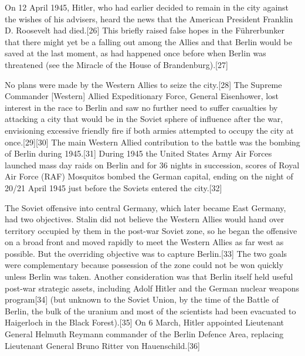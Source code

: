 On 12 April 1945, Hitler, who had earlier decided to remain in the city against the wishes of his advisers, heard the news that the American President Franklin D. Roosevelt had died.[26] This briefly raised false hopes in the Führerbunker that there might yet be a falling out among the Allies and that Berlin would be saved at the last moment, as had happened once before when Berlin was threatened (see the Miracle of the House of Brandenburg).[27]

No plans were made by the Western Allies to seize the city.[28] The Supreme Commander [Western] Allied Expeditionary Force, General Eisenhower, lost interest in the race to Berlin and saw no further need to suffer casualties by attacking a city that would be in the Soviet sphere of influence after the war, envisioning excessive friendly fire if both armies attempted to occupy the city at once.[29][30] The main Western Allied contribution to the battle was the bombing of Berlin during 1945.[31] During 1945 the United States Army Air Forces launched mass day raids on Berlin and for 36 nights in succession, scores of Royal Air Force (RAF) Mosquitos bombed the German capital, ending on the night of 20/21 April 1945 just before the Soviets entered the city.[32]

The Soviet offensive into central Germany, which later became East Germany, had two objectives. Stalin did not believe the Western Allies would hand over territory occupied by them in the post-war Soviet zone, so he began the offensive on a broad front and moved rapidly to meet the Western Allies as far west as possible. But the overriding objective was to capture Berlin.[33] The two goals were complementary because possession of the zone could not be won quickly unless Berlin was taken. Another consideration was that Berlin itself held useful post-war strategic assets, including Adolf Hitler and the German nuclear weapons program[34] (but unknown to the Soviet Union, by the time of the Battle of Berlin, the bulk of the uranium and most of the scientists had been evacuated to Haigerloch in the Black Forest).[35] On 6 March, Hitler appointed Lieutenant General Helmuth Reymann commander of the Berlin Defence Area, replacing Lieutenant General Bruno Ritter von Hauenschild.[36]

